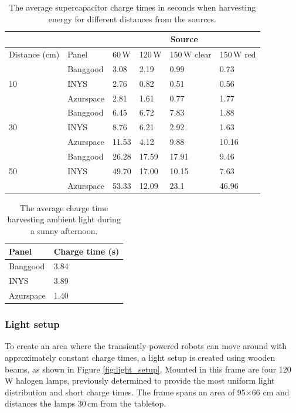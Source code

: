 \begin{table}[t]
	\centering
	\caption{The average supercapacitor charge times in seconds when harvesting energy for different distances from the sources.}
	\label{tab:light_results}
	\begin{tabular}{|l|l||l|l|l|l|}
		\hline
		\multicolumn{2}{|c|}{} & \multicolumn{4}{|c|}{Source} \\
		\hline
		Distance (cm) & Panel & 60\,W & 120\,W & 150\,W clear & 150\,W red \\
		\hline \hline
		\multirow{3}{*}{10} & Banggood& 3.08 & 2.19 & 0.99 & 0.73 \\
		& INYS & 2.76 & 0.82 & 0.51 & 0.56 \\
		& Azurspace & 2.81 & 1.61 & 0.77 & 1.77 \\
		\hline
		\multirow{3}{*}{30} & Banggood & 6.45 & 6.72 & 7.83 & 1.88 \\
		& INYS & 8.76 & 6.21 & 2.92 & 1.63 \\
		& Azurspace & 11.53 & 4.12 & 9.88 & 10.16\\
		\hline
		\multirow{3}{*}{50} & Banggood & 26.28 & 17.59 & 17.91 & 9.46 \\
		& INYS & 49.70 & 17.00 & 10.15 & 7.63 \\
		& Azurspace & 53.33 & 12.09 & 23.1 & 46.96 \\
		\hline
	\end{tabular}
\end{table}

\begin{table}[t]
	\centering
	\caption{The average charge time harvesting ambient light during a sunny afternoon.}
	\label{tab:solar_results}
	\begin{tabular}{|l|l|}
		\hline
		Panel & Charge time (s) \\
		\hline \hline
		Banggood & 3.84\\
		INYS & 3.89\\ 
		Azurspace & 1.40\\
		\hline
	\end{tabular}
\end{table}

\subsubsection{Light setup}

To create an area where the transiently-powered robots can move around with approximately constant charge times, a light setup is created using wooden beams, as shown in Figure \ref{fig:light_setup}.
Mounted in this frame are four 120\,W halogen lamps, previously determined to provide the most uniform light distribution and short charge times.
The frame spans an area of 95$\times$66 cm and distances the lamps 30\,cm from the tabletop.

